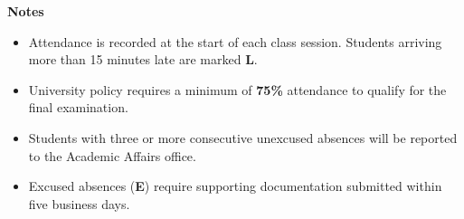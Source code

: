 \documentclass[12pt,landscape]{article}
\begin{document}
\vspace{6pt}

\noindent
\begin{tcolorbox}[
  colback=primary!5,
  colframe=primary!20,
  width=\textwidth,
  boxrule=0.5pt,
  arc=2pt,
  left=10pt, right=10pt, top=8pt, bottom=8pt
]
  \footnotesize\color{primary!80}
  \textbf{\small Notes}\\[4pt]
  \begin{itemize}[nosep, leftmargin=*]
    \item Attendance is recorded at the start of each class session. Students arriving more than 15 minutes late are marked \textbf{L}.
    \item University policy requires a minimum of \textbf{75\%} attendance to qualify for the final examination.
    \item Students with three or more consecutive unexcused absences will be reported to the Academic Affairs office.
    \item Excused absences (\textbf{E}) require supporting documentation submitted within five business days.
  \end{itemize}
\end{tcolorbox}
\end{document}
